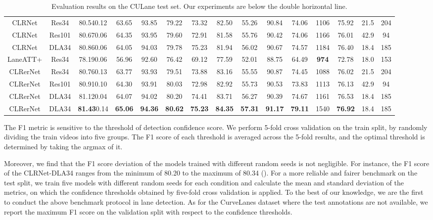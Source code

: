 \documentclass[10pt,twocolumn,letterpaper]{article}
\begin{document}
\begin{table*}
\begin{adjustbox}{width=\textwidth}
\begin{tabular}{ccccccccccccccc}
CLRNet  & Res34 & 80.54\footnotesize{0.12} &63.65 & 93.85 & 79.22 & 73.32 & 82.50 & 55.26 & 90.84 & 74.06 & 1106 & 75.92 &  21.5 & 204 \\
CLRNet  & Res101 &80.67\footnotesize{0.06} &64.35 & 93.95 & 79.60 & 72.91 & 81.58 & 55.76 & 90.42 & 74.06 & 1166 & 76.01 & 42.9 & 94 \\
CLRNet  & DLA34 & 80.86\footnotesize{0.06} &64.05 & 94.03 & 79.78 & 75.23 & 81.94 & 56.02 & 90.67 & 74.57 & 1184 & 76.40 & 18.4 &  185 \\
\hline
LaneATT+ & Res34 &78.19\footnotesize{0.06} &56.96 & 92.60 & 76.42 & 69.12 & 77.59 & 52.01 & 88.75 & 64.49 & \textbf{974} & 72.78 & 18.0 & 153 \\
CLRerNet & Res34 & 80.76\footnotesize{0.13} &63.77 & 93.93 & 79.51 & 73.88 & 83.16 & 55.55 & 90.87 & 74.45 & 1088 & 76.02 &  21.5 &  204 \\
CLRerNet & Res101 & 80.91\footnotesize{0.10} &64.30 & 93.91 & 80.03 & 72.98 & 82.92 & 55.73 & 90.53 & 73.83 & 1113 & 76.13 &   42.9 & 94 \\
CLRerNet & DLA34 & 81.12\footnotesize{0.04} & 64.07 & 94.02 & 80.20 & 74.41 & 83.71 & 56.27 & 90.39 & 74.67 & 1161 & 76.53 &    18.4 & 185 \\
\hline
CLRerNet & DLA34 & \textbf{81.43}\footnotesize{0.14} & \textbf{65.06} & \textbf{94.36} & \textbf{80.62} & \textbf{75.23} & \textbf{84.35} & \textbf{57.31} & \textbf{91.17} & \textbf{79.11} & 1540 & \textbf{76.92} &    18.4 & 185 \\
\hline
\end{tabular}
\end{adjustbox}
\caption{Evaluation results on the CULane test set. Our experiments are below the double horizontal line.}
\label{table:sota_culane}
\end{table*}


The F1 metric is sensitive to the threshold of detection confidence score. 
We perform 5-fold cross validation on the train split, by randomly dividing the train videos into five groups. 
The F1 score of each threshold is averaged across the 5-fold results, and the optimal threshold is determined by taking the argmax of it.

Moreover, we find that the F1 score deviation of the models trained with different random seeds is not negligible.
For instance, the F1 score of the CLRNet-DLA34 ranges from the minimum of 80.20 to the maximum of 80.34 (). 
For a more reliable and fairer benchmark on the test split, we train five models with different random seeds for each condition and calculate the mean and standard deviation of the metrics, on which the confidence thresholds obtained by five-fold cross validation is applied.
To the best of our knowledge, we are the first to conduct the above benchmark protocol in lane detection.
As for the CurveLanes dataset where the test annotations are not available, we report the maximum F1 score on the validation split with respect to the confidence thresholds.
\end{document}
